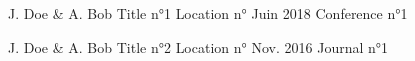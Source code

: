 


\begin{pubentries}


\pubentry
{J. Doe \& A. Bob} %
{Title n°1} %
{Location n°} %
{Juin 2018} %
{Conference n°1} %


\pubentry
{J. Doe \& A. Bob} %
{Title n°2} %
{Location n°} %
{Nov. 2016} %
{Journal n°1} %


\end{pubentries}